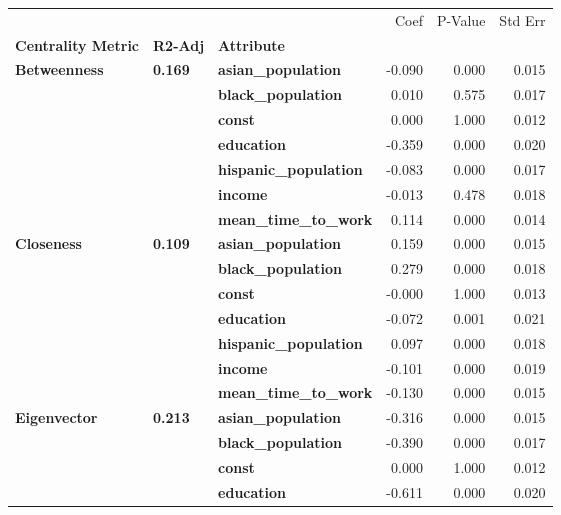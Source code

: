 \begin{tabular}{lllrrr}
\toprule
             &       &                   &   Coef &  P-Value &  Std Err \\
\textbf{Centrality Metric} & \textbf{R2-Adj} & \textbf{Attribute} &        &          &          \\
\midrule
\multirow{7}{*}{\textbf{Betweenness}} & \multirow{7}{*}{\textbf{0.169}} & \textbf{asian\_population} & -0.090 &    0.000 &    0.015 \\
             &       & \textbf{black\_population} &  0.010 &    0.575 &    0.017 \\
             &       & \textbf{const} &  0.000 &    1.000 &    0.012 \\
             &       & \textbf{education} & -0.359 &    0.000 &    0.020 \\
             &       & \textbf{hispanic\_population} & -0.083 &    0.000 &    0.017 \\
             &       & \textbf{income} & -0.013 &    0.478 &    0.018 \\
             &       & \textbf{mean\_time\_to\_work} &  0.114 &    0.000 &    0.014 \\
\cline{1-6}
\cline{2-6}
\multirow{7}{*}{\textbf{Closeness}} & \multirow{7}{*}{\textbf{0.109}} & \textbf{asian\_population} &  0.159 &    0.000 &    0.015 \\
             &       & \textbf{black\_population} &  0.279 &    0.000 &    0.018 \\
             &       & \textbf{const} & -0.000 &    1.000 &    0.013 \\
             &       & \textbf{education} & -0.072 &    0.001 &    0.021 \\
             &       & \textbf{hispanic\_population} &  0.097 &    0.000 &    0.018 \\
             &       & \textbf{income} & -0.101 &    0.000 &    0.019 \\
             &       & \textbf{mean\_time\_to\_work} & -0.130 &    0.000 &    0.015 \\
\cline{1-6}
\cline{2-6}
\multirow{7}{*}{\textbf{Eigenvector}} & \multirow{7}{*}{\textbf{0.213}} & \textbf{asian\_population} & -0.316 &    0.000 &    0.015 \\
             &       & \textbf{black\_population} & -0.390 &    0.000 &    0.017 \\
             &       & \textbf{const} &  0.000 &    1.000 &    0.012 \\
             &       & \textbf{education} & -0.611 &    0.000 &    0.020 \\

\end{tabular}
